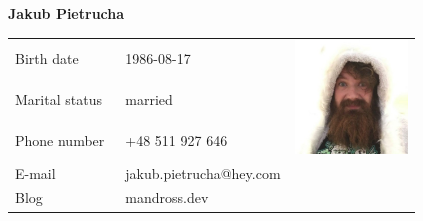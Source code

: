 \documentclass{report}
\begin{document}
\def\thesection{}
\def\thepage{}
\def\thefootnote{}
\begin{center}
    \textbf{\Large{Jakub Pietrucha}}
    \vspace{0.3cm}
\end{center}

\begin{tabular}{p{2.5cm}|p{9cm} r}
Birth date    & \ 1986-08-17 &\multirow{3}{*}{\includegraphics[width=30mm]{me.jpeg}}     \\
Marital status& \ married\\
Phone number  & \ +48 511 927 646\\
E-mail        & \ jakub.pietrucha@hey.com\\
Blog          & \ mandross.dev \\
\end{tabular}
\end{document}
